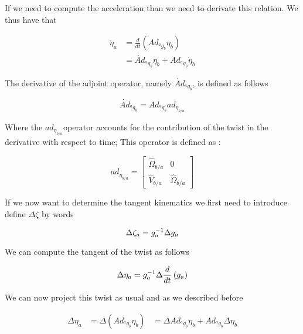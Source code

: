 \documentclass[12pt,a4paper]{book}
\newcommand{\agb}{\ensuremath{{^a g _b}}}
\newcommand{\etaa}{\ensuremath{{\eta_{a}}}}
\newcommand{\etab}{\ensuremath{{\eta_{b}}}}
\newcommand{\etaba}{\ensuremath{{\eta_{b/a}}}}
\newcommand{\dotetaa}{\ensuremath{{\dot{\eta}_{a}}}}
\newcommand{\dotetab}{\ensuremath{{\dot{\eta}_{b}}}}
\newcommand{\Adagb}{\ensuremath{Ad_{\agb}}}
\newcommand{\dotAdagb}{\ensuremath{\dot{Ad}_{\agb}}}
\newcommand{\adetaba}{\ensuremath{ad_{\etaba}}}
\begin{document}
If we need to compute the acceleration than we need to derivate this relation. We thus have that 

\begin{equation}
\begin{aligned}
	\dotetaa 	&= \frac{d}{dt}\left( \Adagb \etab \right) \\
				&= \dotAdagb \etab + \Adagb \dotetab
\end{aligned}
\end{equation}

The derivative of the adjoint operator, namely \dotAdagb{}, is defined as follows

\begin{equation}\label{eq:derivative Ad time}
	\dotAdagb = \Adagb \adetaba
\end{equation}

Where the \adetaba operator accounts for the contribution of the twist in the derivative with respect to time; This operator is defined as :

\begin{equation}
	\adetaba = 
	\begin{bmatrix}
		\hat{\Omega}_{b/a}	&	0 \\
		\hat{V}_{b/a}			&	\hat{\Omega}_{b/a}
	\end{bmatrix}
\end{equation}


If we now want to determine the tangent kinematics we first need to introduce \color{red} define $\Delta \zeta$ by words \color{black}

\begin{equation}\label{eq: Delta zeta}
	\Delta \zeta_{a} = g_a ^{-1} \Delta g_a
\end{equation}


We can compute the tangent of the twist as follows

\begin{equation}
	\Delta \etaa = g_a \inv \Delta \frac{d}{dt}\left(g_a \right)
\end{equation}

We can now project this twist as usual and as we described before

\begin{equation}
\begin{aligned}
	\Delta \etaa 	&= \Delta  \left( \Adagb \etab \right)
					&= \Delta \Adagb \etab  + \Adagb \Delta \etab 
\end{aligned}
\end{equation}
\end{document}
